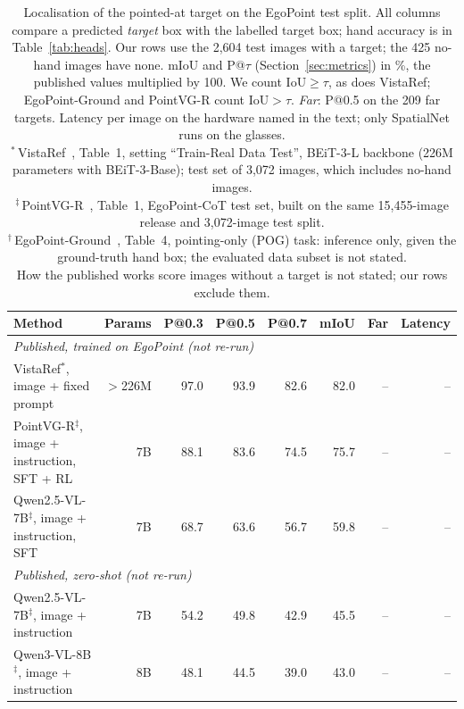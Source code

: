 \begin{table}[t]
  \caption{Localisation of the pointed-at target on the EgoPoint test split. All columns compare a predicted \emph{target} box with the labelled target box; hand accuracy is in Table~\ref{tab:heads}. Our rows use the 2,604 test images with a target; the 425 no-hand images have none. mIoU and P@$\tau$ (Section~\ref{sec:metrics}) in \%, the published values multiplied by 100. We count IoU${\geq}\tau$, as does VistaRef; EgoPoint-Ground and PointVG-R count IoU${>}\tau$. \emph{Far}: P@0.5 on the 209 far targets. Latency per image on the hardware named in the text; only SpatialNet runs on the glasses.\\
  $^\ast$\,VistaRef~\cite{li2026vistaref}, Table~1, setting ``Train-Real Data Test'', BEiT-3-L backbone (226M parameters with BEiT-3-Base); test set of 3,072 images, which includes no-hand images.\\
  $^\ddagger$\,PointVG-R~\cite{li2026pointvgr}, Table~1, EgoPoint-CoT test set, built on the same 15,455-image release and 3,072-image test split.\\
  $^\dagger$\,EgoPoint-Ground~\cite{egopoint}, Table~4, pointing-only (POG) task: inference only, given the ground-truth hand box; the evaluated data subset is not stated.\\
  How the published works score images without a target is not stated; our rows exclude them.}
  \label{tab:main}
  \footnotesize
  \setlength{\tabcolsep}{4pt}
  \begin{tabular}{lrrrrrrr}
    \toprule
    Method & Params & P@0.3 & P@0.5 & P@0.7 & mIoU & Far & Latency \\
    \midrule
    \multicolumn{8}{l}{\emph{Published, trained on EgoPoint (not re-run)}} \\
    \quad VistaRef$^\ast$, image + fixed prompt & $>$226M & 97.0 & 93.9 & 82.6 & 82.0 & -- & -- \\
    \quad PointVG-R$^\ddagger$, image + instruction, SFT + RL & 7B & 88.1 & 83.6 & 74.5 & 75.7 & -- & -- \\
    \quad Qwen2.5-VL-7B$^\ddagger$, image + instruction, SFT & 7B & 68.7 & 63.6 & 56.7 & 59.8 & -- & -- \\
    \multicolumn{8}{l}{\emph{Published, zero-shot (not re-run)}} \\
    \quad Qwen2.5-VL-7B$^\ddagger$, image + instruction & 7B & 54.2 & 49.8 & 42.9 & 45.5 & -- & -- \\
    \quad Qwen3-VL-8B$^\ddagger$, image + instruction & 8B & 48.1 & 44.5 & 39.0 & 43.0 & -- & -- \\

\end{tabular}
\end{table}
